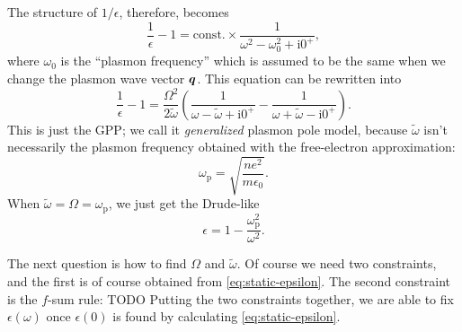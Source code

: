 \documentclass[hyperref, a4paper]{report}
\newcommand*{\ii}{\mathrm{i}}
\newcommand*{\const}{\mathrm{const}}
\begin{document}
The structure of $1/\epsilon$, therefore, becomes 
\begin{equation}
    \frac{1}{\epsilon} - 1 = \const. \times \frac{1}{\omega^2 - \omega_0^2 + \ii 0^+},
\end{equation}
where $\omega_0$ is the ``plasmon frequency'' 
which is assumed to be the same when we change
the plasmon wave vector $\vb*{q}$.
This equation can be rewritten into 
\begin{equation}
    \frac{1}{\epsilon} - 1 = \frac{\Omega^2}{2 \tilde{\omega}} \left(
        \frac{1}{\omega - \tilde{\omega} + \ii 0^+}
        - \frac{1}{\omega + \tilde{\omega} - \ii 0^+}
    \right).
\end{equation}
This is just the GPP; 
we call it \emph{generalized} plasmon pole model, 
because $\tilde{\omega}$ isn't necessarily the plasmon frequency 
obtained with the free-electron approximation: 
\begin{equation}
    \omega_{\text{p}} = \sqrt{\frac{n e^2}{m \epsilon_0}}.
\end{equation}
When $\tilde{\omega} = \Omega = \omega_{\text{p}}$,
we just get the Drude-like 
\begin{equation}
    \epsilon = 1 - \frac{\omega_{\text{p}}^2}{\omega^2}.
\end{equation}

The next question is how to find $\Omega$ and $\tilde{\omega}$.
Of course we need two constraints, 
and the first is of course obtained from \eqref{eq:static-epsilon}.
The second constraint is the $f$-sum rule: TODO
Putting the two constraints together, 
we are able to fix $\epsilon(\omega)$ once $\epsilon(0)$ is found 
by calculating \eqref{eq:static-epsilon}.
\end{document}
